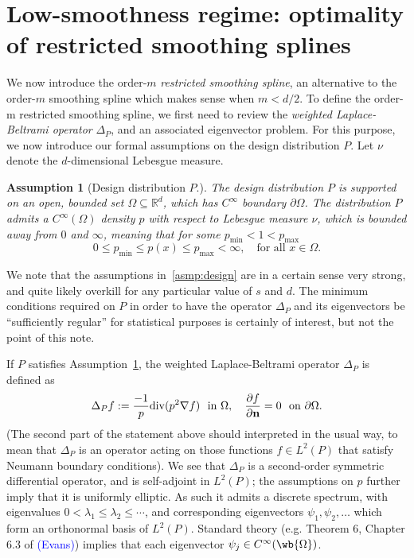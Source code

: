 \documentclass{article}
\newcommand{\Reals}{\mathbb{R}}
\newcommand{\1}{\mathbf{1}}
\newcommand{\Rd}{\Reals^d}
\theoremstyle{alden}
\theoremstyle{aldenthm}
\newtheorem{assumption}{Assumption}
\theoremstyle{definition}
\theoremstyle{remark}
\begin{document}
\section{Low-smoothness regime: optimality of restricted smoothing splines}
We now introduce the order-$m$ \emph{restricted smoothing spline}, an alternative to the order-$m$ smoothing spline which makes sense when $m < d/2$. To define the order-m restricted smoothing spline, we first need to review the \emph{weighted Laplace-Beltrami operator} $\Delta_P$, and an associated eigenvector problem. For this purpose, we now introduce our formal assumptions on the design distribution $P$. Let $\nu$ denote the $d$-dimensional Lebesgue measure.
\begin{assumption}[Design distribution $P$.]
	\label{asmp:design}
	The design distribution $P$ is supported on an open, bounded set $\Omega \subseteq \Rd$, which has $C^{\infty}$ boundary $\partial \Omega$. The distribution $P$ admits a $C^{\infty}(\Omega)$ density $p$ with respect to Lebesgue measure $\nu$, which is bounded away from $0$ and $\infty$, meaning that for some $p_{\min} < 1 < p_{\max}$
	\begin{equation*}
	0 \leq p_{\min} \leq p(x) \leq p_{\max} < \infty,\quad\textrm{for all $x \in \Omega$.}
	\end{equation*}
\end{assumption} 
We note that the assumptions in~\eqref{asmp:design} are in a certain sense very strong, and quite likely overkill for any particular value of $s$ and $d$. The minimum conditions required on $P$ in order to have the operator $\Delta_P$ and its eigenvectors be ``sufficiently regular'' for statistical purposes is certainly of interest, but not the point of this note. 

If $P$ satisfies Assumption~\ref{asmp:design}, the weighted Laplace-Beltrami operator $\Delta_P$ is defined as 
\begin{equation*}
\Delta_Pf := \frac{-1}{p} \mathrm{div}(p^2 \nabla f)~~\textrm{in $\Omega$}, \quad \frac{\partial f}{\partial {\bf n}} = 0~~\textrm{on $\partial \Omega$.}
\end{equation*}
(The second part of the statement above should interpreted in the usual way, to mean that $\Delta_P$ is an operator acting on those functions $f \in L^2(P)$ that satisfy Neumann boundary conditions). We see that $\Delta_P$ is a second-order symmetric differential operator, and is self-adjoint in $L^2(P)$; the assumptions on $p$ further imply that it is uniformly elliptic. As such it admits a discrete spectrum, with eigenvalues $0 < \lambda_1 \leq \lambda_2 \leq \cdots$, and corresponding eigenvectors $\psi_1,\psi_2,\ldots$ which form an orthonormal basis of $L^2(P)$. Standard theory (e.g. Theorem 6, Chapter 6.3 of \textcolor{blue}{(Evans)}) implies that each eigenvector $\psi_j \in C^{\infty}(\wb{\Omega})$. 
\end{document}
